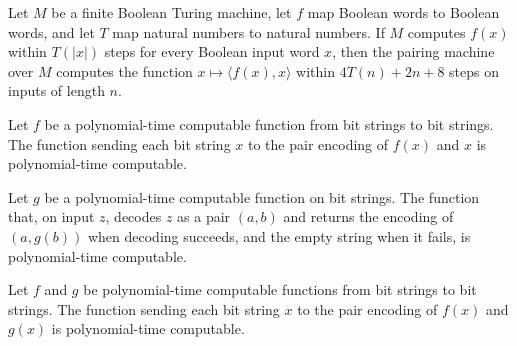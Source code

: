 \begin{lemma}
\label{Complexity.satPair_computes}
\leanok
{}
Let $M$ be a finite Boolean Turing machine, let $f$ map Boolean words to Boolean words,
and let $T$ map natural numbers to natural numbers. If $M$ computes $f(x)$ within
$T(|x|)$ steps for every Boolean input word $x$, then the pairing machine over $M$
computes the function $x\mapsto\langle f(x),x\rangle$ within $4T(n)+2n+8$ steps on
inputs of length $n$.
\end{lemma}

\begin{lemma}
\label{Complexity.sat_pt_pair_input}
\leanok
{}
Let $f$ be a polynomial-time computable function from bit strings to bit strings. The
function sending each bit string $x$ to the pair encoding of $f(x)$ and $x$ is
polynomial-time computable.
\end{lemma}

\begin{lemma}
\label{Complexity.sat_pt_mapSnd}
\leanok
{}
Let $g$ be a polynomial-time computable function on bit strings. The function that, on
input $z$, decodes $z$ as a pair $(a,b)$ and returns the encoding of $(a,g(b))$ when
decoding succeeds, and the empty string when it fails, is polynomial-time computable.
\end{lemma}

\begin{lemma}
\label{Complexity.sat_pt_pair}
\leanok
{}
Let $f$ and $g$ be polynomial-time computable functions from bit strings to bit strings.
The function sending each bit string $x$ to the pair encoding of $f(x)$ and $g(x)$ is
polynomial-time computable.
\end{lemma}

